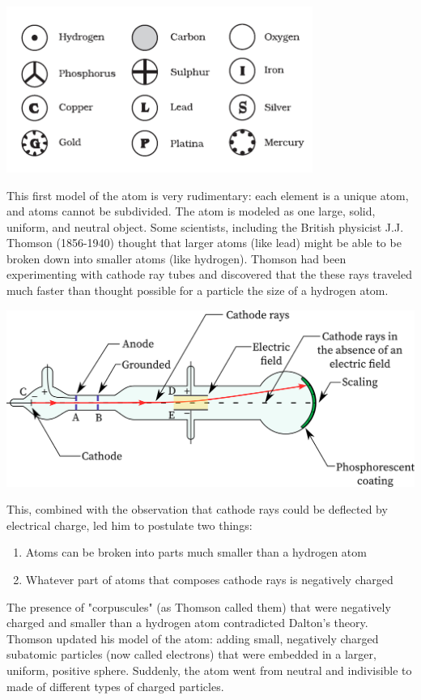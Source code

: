 \includegraphics[width=0.75\textwidth]{daltons_model.png}

This first model of the atom is very rudimentary: each element is a unique atom, 
and atoms cannot be subdivided. The atom is modeled as one large, solid, uniform, 
and neutral object. Some scientists, including the British physicist J.J. Thomson 
(1856-1940) thought that larger atoms (like lead) might be able to be broken down
into smaller atoms (like hydrogen). Thomson had been experimenting with cathode 
ray tubes and discovered that the these rays traveled much faster than thought 
possible for a particle the size of a hydrogen atom. 

\includegraphics[width=1\textwidth]{cathode-ray-tube.png}

This, combined with the observation that cathode rays could be deflected by 
electrical charge, led him to postulate two things:

\begin{enumerate}
\item Atoms can be broken into parts much smaller than a hydrogen atom
\item Whatever part of atoms that composes cathode rays is negatively charged
\end{enumerate}

The presence of "corpuscules" (as Thomson called them) that were negatively 
charged and smaller than a hydrogen atom contradicted Dalton's theory. Thomson 
updated his model of the atom: adding small, negatively charged subatomic 
particles (now called electrons) that were embedded in a larger, uniform, positive 
sphere. Suddenly, the atom went from neutral and indivisible to made of different 
types of charged particles. 

